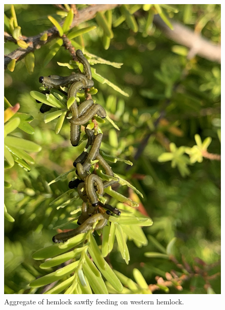 \begin{figure}[H]
\begin{center}
\vspace{2mm}
\includegraphics[width=\textwidth]{img/hemlock_sawfly_larvae.jpg}
\caption{Aggregate of hemlock sawfly feeding on western hemlock.}
\label{hemlock_sawfly_larvae}
\end{center}
\end{figure} 



